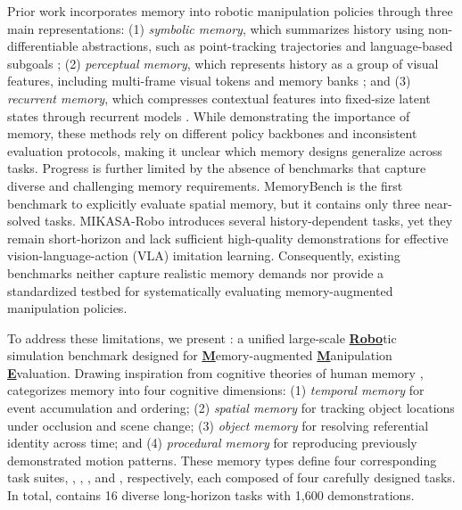 Prior work incorporates memory into robotic manipulation policies through three main representations:
(1) \textit{symbolic memory}, which summarizes history using non-differentiable abstractions, such as point-tracking trajectories \cite{chen2025history} and language-based subgoals \cite{sridhar2025memer};
(2) \textit{perceptual memory}, which represents history as a group of visual features, including  multi-frame visual tokens \cite{jang2025contextvla} and memory banks \cite{fang2025sam2act, shi2025memoryvla};
and (3) \textit{recurrent memory}, which compresses contextual features into fixed-size latent states through recurrent models \cite{zhou2025mtil, liu2024robomamba}.
While demonstrating the importance of memory, these methods rely on different policy backbones and inconsistent evaluation protocols, making it unclear which memory designs generalize across tasks.
Progress is further limited by the absence of benchmarks that capture diverse and challenging memory requirements.
MemoryBench \cite{fang2025sam2act} is the first benchmark to explicitly evaluate spatial memory, but it contains only three near-solved tasks. MIKASA-Robo \cite{cherepanov2025memory} introduces several history-dependent tasks, yet they remain short-horizon and lack sufficient high-quality demonstrations for effective vision-language-action (VLA) imitation learning. Consequently, existing benchmarks neither capture realistic memory demands nor provide a standardized testbed for systematically evaluating memory-augmented manipulation policies.

To address these limitations, we present \textbf{\benchname}: a unified large-scale \underline{\textbf{Robo}}tic simulation benchmark designed for \underline{\textbf{M}}emory-augmented \underline{\textbf{M}}anipulation \underline{\textbf{E}}valuation.
Drawing inspiration from cognitive theories of human memory \cite{atkinson1968human}, \benchname\xspace categorizes memory into four cognitive dimensions: (1) \textit{temporal memory} for event accumulation and ordering; (2) \textit{spatial memory} for tracking object locations under occlusion and scene change; (3) \textit{object memory} for resolving referential identity across time; and (4) \textit{procedural memory} for reproducing previously demonstrated motion patterns. These memory types define four corresponding task suites, \TSone, \TStwo, \TSthree, and \TSfour, respectively, each composed of four carefully designed tasks. In total, \benchname\xspace contains 16 diverse long-horizon tasks with 1,600 demonstrations.

